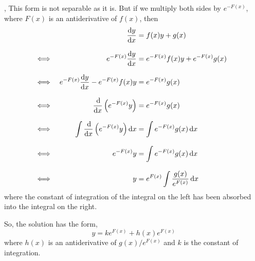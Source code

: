 \documentclass[../MathsNotesBase.tex]{subfiles}
\begin{document}
{		\biggerskip
		\begin{exe}
			\label{ex:diff-eq-basic-ivp}
		\end{exe}
		
		\sep
		This form is not separable as it is. But if we multiply both sides by $e^{-F(x)}$, where $F(x)$ is an antiderivative of $f(x)$, then
		\begin{align*}
		&& \frac{\dif y}{\dif x} &= f(x)y + g(x) \\[8pt]
		&\iff & e^{-F(x)}\frac{\dif y}{\dif x} &= e^{-F(x)}f(x)y + e^{-F(x)}g(x) &\sidecomment{} \\[8pt]
		&\iff & e^{-F(x)}\frac{\dif y}{\dif x} - e^{-F(x)}f(x)y &= e^{-F(x)}g(x) &\sidecomment{} \\[8pt]
		&\iff & \frac{\dif}{\dif x} \left(e^{-F(x)}y\right) &= e^{-F(x)}g(x) &\sidecomment{} \\[8pt]
		&\iff & \int \frac{\dif}{\dif x} \left(e^{-F(x)}y\right) \dif x &= \int e^{-F(x)}g(x) \dif x &\sidecomment{} \\[8pt]
		&\iff & e^{-F(x)}y &= \int e^{-F(x)}g(x) \dif x \\[8pt]
		&\iff & y &= e^{F(x)}\int \frac{g(x)}{e^{F(x)}} \dif x
		\end{align*}
		where the constant of integration of the integral on the left has been absorbed into the integral on the right.\\
		
		
		\medskip
		So, the solution has the form,
		\[ y = k e^{F(x)} + h(x) e^{F(x)} \]
		where $h(x)$ is an antiderivative of ${ g(x)/e^{F(x)} }$ and $k$ is the constant of integration.\\
		
}
\end{document}
